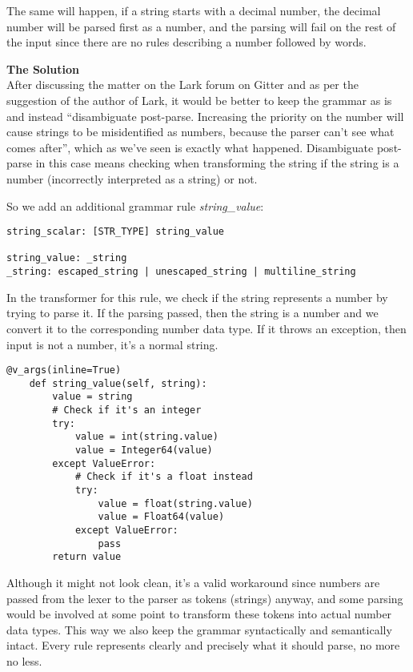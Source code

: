 \documentclass[12pt]{article}
\begin{document}
The same will happen, if a string starts with a decimal number, the decimal number will be parsed first as a number, and the parsing will fail on the rest of the input since there are no rules describing a number followed by words.

\textbf{The Solution} \\
After discussing the matter on the Lark forum on Gitter and as per the suggestion of the author of Lark, it would be better to keep the grammar as is and instead “disambiguate post-parse. Increasing the priority on the number will cause strings to be misidentified as numbers, because the parser can’t see what comes after”, which as we've seen is exactly what happened. Disambiguate post-parse in this case means checking when transforming the string if the string is a number (incorrectly interpreted as a string) or not.

So we add an additional grammar rule \emph{string\_value}:
\begin{lstlisting}
string_scalar: [STR_TYPE] string_value

string_value: _string
_string: escaped_string | unescaped_string | multiline_string
\end{lstlisting}

In the transformer for this rule, we check if the string represents a number by trying to parse it. If the parsing passed, then the string is a number and we convert it to the corresponding number data type. If it throws an exception, then input is not a number, it's a normal string.

\begin{lstlisting}[label=transformer:string_value]
@v_args(inline=True)
    def string_value(self, string):
        value = string
        # Check if it's an integer
        try:
            value = int(string.value)
            value = Integer64(value)
        except ValueError:
            # Check if it's a float instead
            try:
                value = float(string.value)
                value = Float64(value)
            except ValueError:
                pass
        return value
\end{lstlisting}

Although it might not look clean, it's a valid workaround since numbers are passed from the lexer to the parser as tokens (strings) anyway, and some parsing would be involved at some point to transform these tokens into actual number data types. This way we also keep the grammar syntactically and semantically intact. Every rule represents clearly and precisely what it should parse, no more no less.
\end{document}
